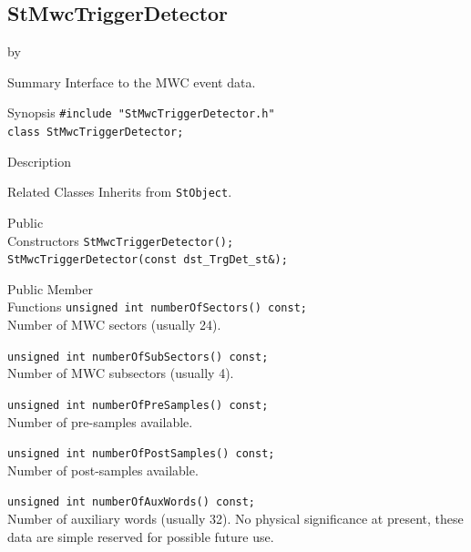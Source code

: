 \documentclass[twoside]{article}
\newcommand{\entrylabel}[1]{\mbox{\textbf{{#1}}}\hfil}%
\newenvironment{entry}
{\begin{list}{}%
    {\renewcommand{\makelabel}{\entrylabel}%
     \setlength{\labelwidth}{90pt}%
     \setlength{\leftmargin}{\labelwidth}
     \advance\leftmargin by \labelsep%
      }%
    }%
  {\end{list}}
\newcommand{\Entrylabel}[1]%
{\raisebox{0pt}[1ex][0pt]{\makebox[\labelwidth][l]%
    {\parbox[t]{\labelwidth}{\hspace{0pt}\textbf{{#1}}}}}}
\newenvironment{Entry}%
{\renewcommand{\entrylabel}{\Entrylabel}\begin{entry}}%
  {\end{entry}}
\begin{document}
\subsection{StMwcTriggerDetector}
\label{sec:StMwcTriggerDetector}
\begin{Entry}
\item[Summary]
    Interface to the MWC event data.
    
\item[Synopsis]
    \verb+#include "StMwcTriggerDetector.h"+\\
    \verb+class StMwcTriggerDetector;+\\
    
\item[Description]

\item[Related Classes]
    Inherits from \texttt{StObject}.
    
\item[Public\\ Constructors]
    \verb+StMwcTriggerDetector();+\\
    \verb+StMwcTriggerDetector(const dst_TrgDet_st&);+\\
    
\item[Public Member\\ Functions]
    \verb+unsigned int numberOfSectors() const;+\\
    Number of MWC sectors (usually 24).
    
    \verb+unsigned int numberOfSubSectors() const;+\\
    Number of MWC subsectors (usually 4).
    
    \verb+unsigned int numberOfPreSamples() const;+\\
    Number of pre-samples available.
    
    \verb+unsigned int numberOfPostSamples() const;+\\
    Number of post-samples available.
    
    \verb+unsigned int numberOfAuxWords() const;+\\
    Number of auxiliary words (usually 32).  No physical significance
    at present, these data are simple reserved for possible future
    use.
    

\end{Entry}
\end{document}
